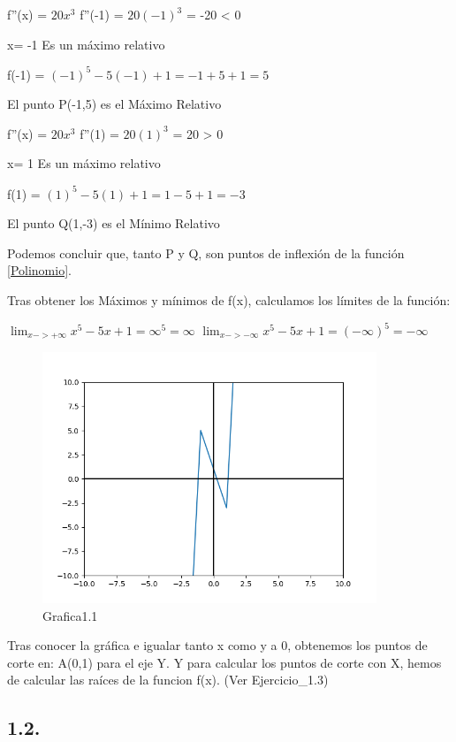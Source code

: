 \documentclass[12pt]{article}
\begin{document}
        f''(x) = $20x^3$
        f''(-1) = $20(-1)^3$ = -20 < 0

        x= -1 Es un máximo relativo

        f(-1) = $(-1)^5-5(-1)+1 = -1+5+1 = 5$

        El punto P(-1,5) es el Máximo Relativo

        f''(x) = $20x^3$
        f''(1) = $20(1)^3$ = 20 > 0

        x= 1 Es un máximo relativo

        f(1) = $(1)^5-5(1)+1 = 1-5+1 = -3$

        El punto Q(1,-3) es el Mínimo Relativo

        Podemos concluir que, tanto P y Q, son puntos de inflexión de la función \eqref{Polinomio}.

        Tras obtener los Máximos y mínimos de f(x), calculamos los límites de la función:

        $\lim_{x->+\infty} x^5-5x+1 = \infty^5 = \infty$
        $\lim_{x->-\infty} x^5-5x+1 = (-\infty)^5 = -\infty$

        \begin{figure}[ht]\label{f_x}
          \centering %
          \includegraphics[width=10cm]{Ejerciocio1.1.png} %
          \caption[short]{Grafica1.1} %
        \end{figure}      
        
        Tras conocer la gráfica e igualar tanto x como y a 0, obtenemos los puntos de corte en:
        A(0,1) para el eje Y.
        Y para calcular los puntos de corte con X, hemos de calcular las raíces de la funcion f(x). (Ver Ejercicio_1.3)

      \subsection{1.2.}
        
\end{document}

